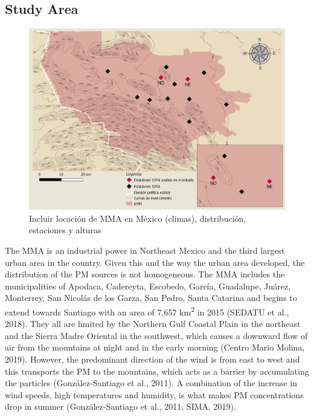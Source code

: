 \subsection{Study Area}
\begin{figure}[H]
    \centering
    \includegraphics[scale=0.15]{images/map.png}
    \caption{Incluir locación de MMA en México (climas), distribución, estaciones y alturas}
    \label{fig:map}
\end{figure}
The MMA is an industrial power in Northeast Mexico and the third largest urban area in the country.
Given this and the way the urban area developed, the distribution of the PM sources is not homogeneous.
The MMA includes the municipalities of Apodaca, Cadereyta, Escobedo, García, Guadalupe, Juárez, Monterrey,
San Nicolás de los Garza, San Pedro, Santa Catarina and begins to extend towards Santiago with an area of 7,657
km\textsuperscript{2} in 2015 (SEDATU et al., 2018). They all are limited by the Northern Gulf Coastal Plain
in the northeast and the Sierra Madre Oriental in the southwest, which causes a downward flow of
air from the mountains at night and in the early morning (Centro Mario Molina, 2019). However, the predominant
direction of the wind is from east to west and this transports the PM to the mountains, which acts as a barrier
by accumulating the particles (González-Santiago et al., 2011). A combination of the increase in wind speeds,
high temperatures and humidity, is what makes PM concentrations drop in summer
(González-Santiago et al., 2011; SIMA, 2019).
